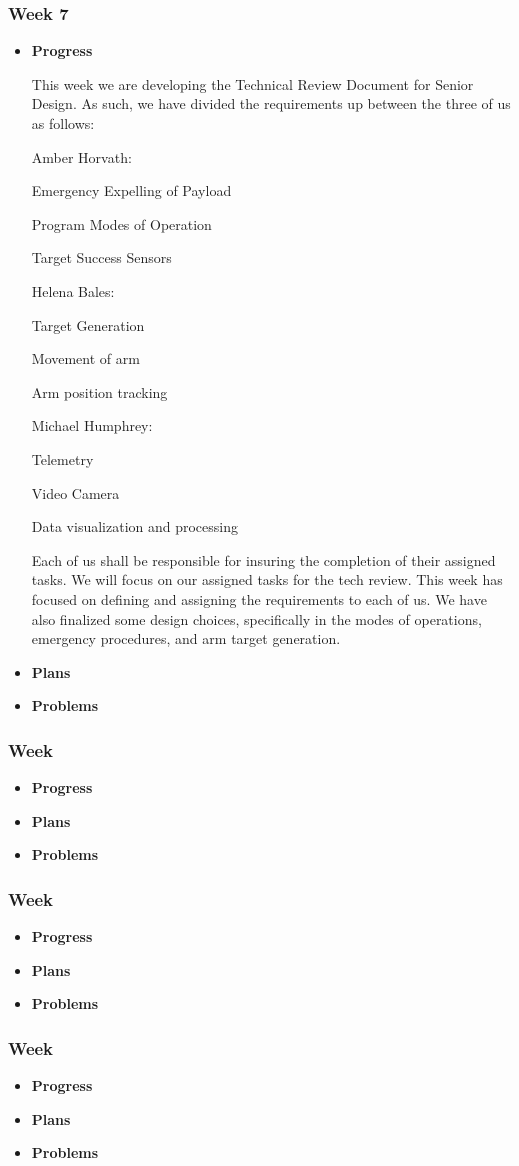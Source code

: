 \subsubsection{Week 7}
\begin{itemize}
\item{
\textbf{Progress}

This week we are developing the Technical Review Document for Senior Design. As such, we have divided the requirements up between the three of us as follows:

Amber Horvath:

    Emergency Expelling of Payload

    Program Modes of Operation

    Target Success Sensors

Helena Bales:

    Target Generation

    Movement of arm

    Arm position tracking

Michael Humphrey:

    Telemetry

    Video Camera

    Data visualization and processing

Each of us shall be responsible for insuring the completion of their assigned tasks. We will focus on our assigned tasks for the tech review. This week has focused on defining and assigning the requirements to each of us. We have also finalized some design choices, specifically in the modes of operations, emergency procedures, and arm target generation.
}
\item{
\textbf{Plans}
}
\item{
\textbf{Problems}
}
\end{itemize}

\subsubsection{Week }
\begin{itemize}
\item{
\textbf{Progress}
}
\item{
\textbf{Plans}
}
\item{
\textbf{Problems}
}
\end{itemize}

\subsubsection{Week }
\begin{itemize}
\item{
\textbf{Progress}
}
\item{
\textbf{Plans}
}
\item{
\textbf{Problems}
}
\end{itemize}

\subsubsection{Week }
\begin{itemize}
\item{
\textbf{Progress}
}
\item{
\textbf{Plans}
}
\item{
\textbf{Problems}
}
\end{itemize}
